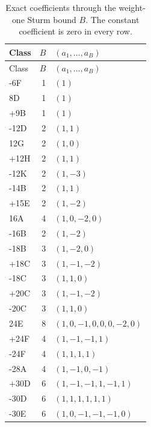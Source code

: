 \begin{longtable}{@{}lrl@{}}
\caption{Exact coefficients through the weight-one Sturm bound \(B\).
The constant coefficient is zero in every row.}\label{tab:weight-one-checks}\\
\toprule Class&\(B\)&\((a_1,\ldots,a_B)\)\\\midrule\endfirsthead
\toprule Class&\(B\)&\((a_1,\ldots,a_B)\)\\\midrule\endhead
-6F & 1 & $(1)$ \\
8D & 1 & $(1)$ \\
+9B & 1 & $(1)$ \\
-12D & 2 & $(1,1)$ \\
12G & 2 & $(1,0)$ \\
+12H & 2 & $(1,1)$ \\
-12K & 2 & $(1,-3)$ \\
-14B & 2 & $(1,1)$ \\
+15E & 2 & $(1,-2)$ \\
16A & 4 & $(1,0,-2,0)$ \\
-16B & 2 & $(1,-2)$ \\
-18B & 3 & $(1,-2,0)$ \\
+18C & 3 & $(1,-1,-2)$ \\
-18C & 3 & $(1,1,0)$ \\
+20C & 3 & $(1,-1,-2)$ \\
-20C & 3 & $(1,1,0)$ \\
24E & 8 & $(1,0,-1,0,0,0,-2,0)$ \\
+24F & 4 & $(1,-1,-1,1)$ \\
-24F & 4 & $(1,1,1,1)$ \\
-28A & 4 & $(1,-1,0,-1)$ \\
+30D & 6 & $(1,-1,-1,1,-1,1)$ \\
-30D & 6 & $(1,1,1,1,1,1)$ \\
-30E & 6 & $(1,0,-1,-1,-1,0)$ \\
\bottomrule\end{longtable}
